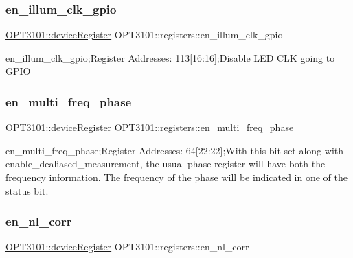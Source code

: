 \subsubsection{\texorpdfstring{en\+\_\+illum\+\_\+clk\+\_\+gpio}{en\_illum\_clk\_gpio}}
{\footnotesize\ttfamily \mbox{\hyperlink{class_o_p_t3101_1_1device_register}{O\+P\+T3101\+::device\+Register}} O\+P\+T3101\+::registers\+::en\+\_\+illum\+\_\+clk\+\_\+gpio}



en\+\_\+illum\+\_\+clk\+\_\+gpio;Register Addresses\+: 113\mbox{[}16\+:16\mbox{]};Disable L\+ED C\+LK going to G\+P\+IO 

\mbox{\label{class_o_p_t3101_1_1registers_a0d7d9f45b7942f6913a4a57e9481beaf}} 
\subsubsection{\texorpdfstring{en\+\_\+multi\+\_\+freq\+\_\+phase}{en\_multi\_freq\_phase}}
{\footnotesize\ttfamily \mbox{\hyperlink{class_o_p_t3101_1_1device_register}{O\+P\+T3101\+::device\+Register}} O\+P\+T3101\+::registers\+::en\+\_\+multi\+\_\+freq\+\_\+phase}



en\+\_\+multi\+\_\+freq\+\_\+phase;Register Addresses\+: 64\mbox{[}22\+:22\mbox{]};With this bit set along with enable\+\_\+dealiased\+\_\+measurement, the usual phase register will have both the frequency information. The frequency of the phase will be indicated in one of the status bit. 

\mbox{\label{class_o_p_t3101_1_1registers_a280b2058efcda6af421ff2b96e0f576a}} 
\subsubsection{\texorpdfstring{en\+\_\+nl\+\_\+corr}{en\_nl\_corr}}
{\footnotesize\ttfamily \mbox{\hyperlink{class_o_p_t3101_1_1device_register}{O\+P\+T3101\+::device\+Register}} O\+P\+T3101\+::registers\+::en\+\_\+nl\+\_\+corr}



